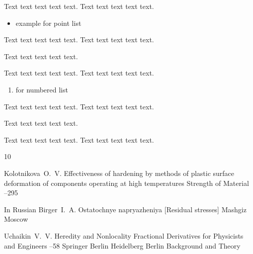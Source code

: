 Text text text text text.
Text text text text text.



\begin{itemize}
\item example for point list
\end {itemize}

Text text text text text. 
Text text text text text.

Text text text text text.

Text text text text text.
Text text text text text.


    \begin{enumerate}
    \item for numbered list
 
    \end{enumerate}


Text text text text text. 
Text text text text text.

Text text text text text.

Text text text text text.
Text text text text text.


\begin{thebibliography}{10}

\by Kolotnikova~O.~V.
\paper Effectiveness of hardening by methods of plastic surface deformation of components operating at high temperatures
\jour Strength of Material
–295


\lang In Russian
\by Birger~I.~A.
\book  Ostatochnye napryazheniya \rm [Residual stresses]
\publ Mashgiz
\publaddr  Moscow

\by Uchaikin~V.~V.
\paper Heredity and Nonlocality
\inbook Fractional Derivatives for Physicists and Engineers
--58
\publ Springer Berlin Heidelberg
\publaddr Berlin
\volinfo Background and Theory



\end{thebibliography}

\newpage

\makerutitle



